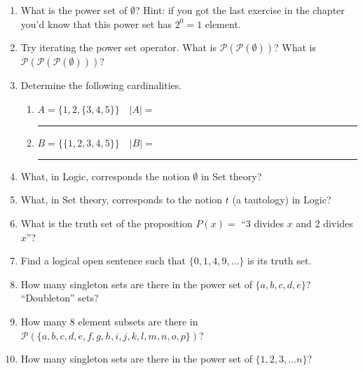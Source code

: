 \begin{enumerate}
\item What is the power set of $\emptyset$?  Hint: if you got the last exercise
in the chapter you'd know that this power set has $2^0 = 1$ element.

\item Try iterating the power set operator.  What is ${\mathcal P}({\mathcal P}(\emptyset))$?  What is ${\mathcal P}({\mathcal P}({\mathcal P}(\emptyset)))$?

\item Determine the following cardinalities.
  \begin{enumerate}
    \item $A = \{ 1, 2, \{3, 4, 5\}\} \quad |A| = $\rule{36pt}{1pt}
    \item $B = \{ \{1, 2, 3, 4, 5\} \} \quad |B| = $\rule{36pt}{1pt}  
  \end{enumerate}

\item What, in Logic, corresponds the notion $\emptyset$ in Set theory?

\item What, in Set theory, corresponds to the notion $t$ (a tautology) in Logic?

\item What is the truth set of the proposition $P(x) = $ ``3 divides $x$ and 2 divides $x$''?

\item Find a logical open sentence such that $\{0, 1, 4, 9, \ldots \}$ is
its truth set.

\item How many singleton sets are there in the power set of 
$\{a,b,c,d,e\}$?  ``Doubleton'' sets?

\item How many 8 element subsets are there in
${\mathcal P}(\{a,b,c,d,e,f,g,h,i,j,k,l,m,n,o,p\})$?

\item How many singleton sets are there in the power set of 
$\{1,2,3, \ldots n\}$?

\end{enumerate}




